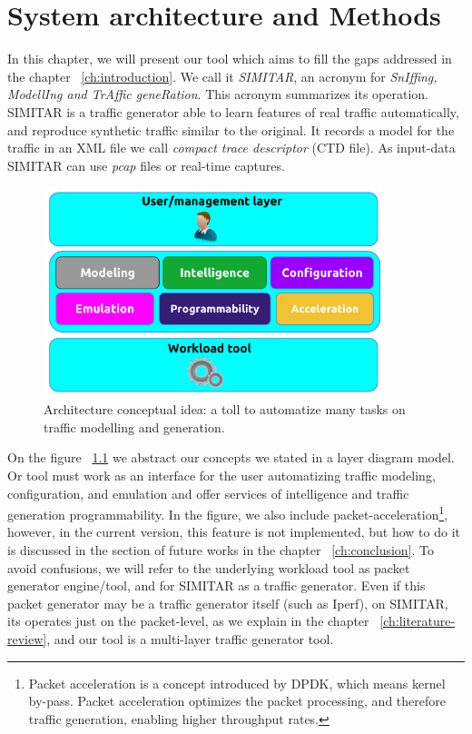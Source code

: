 \chapter{System architecture and Methods}\label{ch:architecture}


In this chapter, we will present our tool which aims to fill the gaps addressed in the chapter ~\ref{ch:introduction}. We call it \textit{SIMITAR}, an acronym for \textit{SnIffing, ModellIng and TrAffic geneRation}.  This acronym summarizes its operation. SIMITAR is a traffic generator able to learn features of real traffic automatically, and reproduce synthetic traffic similar to the original. It records a model for the traffic in an XML file we call \textit{compact trace descriptor} (CTD file). As input-data SIMITAR can use \textit{pcap} files or real-time captures.  


\begin{figure}[ht!]
    \centering
    \includegraphics[height=2.4in]{figures/ch1/layer-diagram}
    \caption{ Architecture conceptual idea: a toll to automatize many tasks on traffic modelling and generation.}
    \label{fig:layer-diagram}
\end{figure}

On the figure ~\ref{fig:layer-diagram} we abstract our concepts we stated in a layer diagram model. Or tool must work as an interface for the user automatizing traffic modeling, configuration, and emulation and offer services of intelligence and traffic generation programmability. In the figure, we also include packet-acceleration\footnote{Packet acceleration is a concept introduced by DPDK\cite{web-dpdk}, which means kernel by-pass. Packet acceleration optimizes the packet processing, and therefore traffic generation, enabling higher throughput rates.}, however, in the current version, this feature is not implemented, but how to do it is discussed in the section of future works in the chapter ~\ref{ch:conclusion}. To avoid confusions, we will refer to the underlying workload tool as packet generator engine/tool, and for SIMITAR as a traffic generator. Even if this packet generator may be a traffic generator itself (such as Iperf), on SIMITAR, its operates just on the packet-level, as we explain in the chapter ~\ref{ch:literature-review}, and our tool is a multi-layer traffic generator tool.


